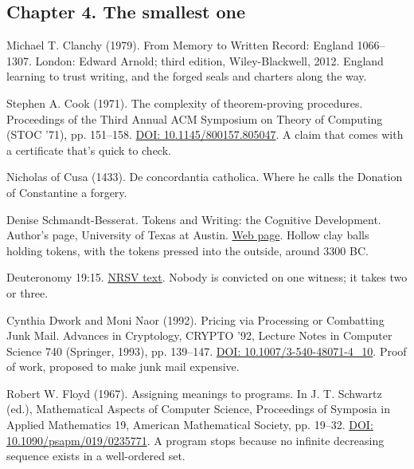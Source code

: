 \documentclass[11pt,twoside]{article}
\theoremstyle{thielethm}
\theoremstyle{thieledef}
\theoremstyle{thieledef}
\theoremstyle{thieledef}
\theoremstyle{thielethm}
\theoremstyle{thieleobs}
\theoremstyle{thielethm}
\begin{document}
\subsection*{Chapter 4. The smallest one}

\noindent Michael T. Clanchy (1979). From Memory to Written Record: England 1066--1307. London: Edward Arnold; third edition, Wiley-Blackwell, 2012. England learning to trust writing, and the forged seals and charters along the way.
\par\medskip

\noindent Stephen A. Cook (1971). The complexity of theorem-proving procedures. Proceedings of the Third Annual ACM Symposium on Theory of Computing (STOC '71), pp. 151--158. \href{https://doi.org/10.1145/800157.805047}{DOI: 10.1145/800157.805047}. A claim that comes with a certificate that's quick to check.
\par\medskip

\noindent Nicholas of Cusa (1433). De concordantia catholica. Where he calls the Donation of Constantine a forgery.
\par\medskip

\noindent Denise Schmandt-Besserat. Tokens and Writing: the Cognitive Development. Author's page, University of Texas at Austin. \href{https://sites.utexas.edu/dsb/tokens/tokens-and-writing-the-cognitive-development/}{Web page}. Hollow clay balls holding tokens, with the tokens pressed into the outside, around 3300 BC.
\par\medskip

\noindent Deuteronomy 19:15. \href{https://www.biblegateway.com/passage/?search=Deuteronomy+19:15&version=NRSV}{NRSV text}. Nobody is convicted on one witness; it takes two or three.
\par\medskip

\noindent Cynthia Dwork and Moni Naor (1992). Pricing via Processing or Combatting Junk Mail. Advances in Cryptology, CRYPTO '92, Lecture Notes in Computer Science 740 (Springer, 1993), pp. 139--147. \href{https://doi.org/10.1007/3-540-48071-4_10}{DOI: 10.1007/3-540-48071-4\_10}. Proof of work, proposed to make junk mail expensive.
\par\medskip

\noindent Robert W. Floyd (1967). Assigning meanings to programs. In J. T. Schwartz (ed.), Mathematical Aspects of Computer Science, Proceedings of Symposia in Applied Mathematics 19, American Mathematical Society, pp. 19--32. \href{https://doi.org/10.1090/psapm/019/0235771}{DOI: 10.1090/psapm/019/0235771}. A program stops because no infinite decreasing sequence exists in a well-ordered set.
\par\medskip
\end{document}

